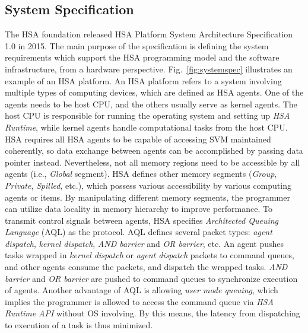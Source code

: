         \subsection{System Specification}
        The HSA foundation released HSA Platform System Architecture Specification 1.0 \cite{systemspec} in 2015.
        The main purpose of the specification is defining the system requirements which support the HSA programming model and the software infrastructure, from a hardware perspective.
        Fig.~\ref{fig:systemspec} illustrates an example of an HSA platform.
        An HSA platform refers to a system involving multiple types of computing devices, 
        which are defined as HSA agents.
        One of the agents needs to be host CPU, and the others usually serve as kernel agents. 
        The host CPU is responsible for running the operating system and setting up \textit{HSA Runtime},
        while kernel agents handle computational tasks from the host CPU.
        HSA requires all HSA agents to be capable of accessing SVM maintained coherently, 
        so data exchange between agents can be accomplished by passing data pointer instead.
        Nevertheless, not all memory regions need to be accessible by all agents (i.e., \textit{Global} segment).
        HSA defines other memory segments (\textit{Group}, \textit{Private}, \textit{Spilled}, etc.), 
        which possess various accessibility by various computing agents or items.
        By manipulating different memory segments, the programmer can utilize data locality in memory hierarchy to improve performance.
        To transmit control signals between agents, HSA specifies \textit{Architected Queuing Language} (AQL) as the protocol. 
        AQL defines several packet types: \textit{agent dispatch}, \textit{kernel dispatch}, \textit{AND barrier} and \textit{OR barrier}, etc.
        An agent pushes tasks wrapped in \textit{kernel dispatch} or \textit{agent dispatch} packets to command queues, 
        and other agents consume the packets, and dispatch the wrapped tasks.
        \textit{AND barrier} and \textit{OR barrier} are pushed to command queues to synchronize execution of agents.
        Another advantage of AQL is allowing \textit{user mode queuing},
        which implies the programmer is allowed to access the command queue via \textit{HSA Runtime API} without OS involving.
        By this means, the latency from dispatching to execution of a task is thus minimized.
        \vspace{\textfig}

